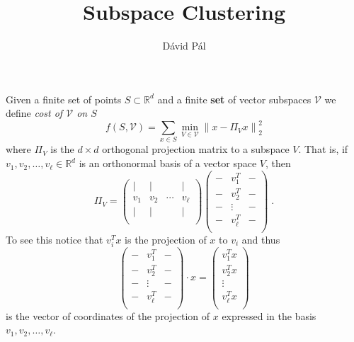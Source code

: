 \documentclass{article}
\newcommand{\R}{\mathbb{R}}
\newcommand{\V}{\mathcal{V}}
\newcommand{\norm}[1]{\left\|#1\right\|}
\begin{document}
\title{Subspace Clustering}
\author{D\'avid P\'al}
\maketitle

Given a finite set of points $S \subset \R^d$ and a finite \textbf{set} of
vector subspaces $\V$ we define \emph{cost of $\V$ on $S$}
$$
f(S, \V) = \sum_{x \in S} \min_{V \in \V} \norm{x - \Pi_V x}_2^2
$$
where $\Pi_V$ is the $d\times d$ orthogonal projection matrix to a subspace $V$.
That is, if $v_1, v_2, \dots, v_\ell \in \R^d$ is an orthonormal basis
of a vector space $V$, then
$$
\Pi_V =
\begin{pmatrix}
\vert & \vert &  & \vert \\
v_1 & v_2 & \cdots & v_\ell \\
\vert & \vert &  & \vert \\
\end{pmatrix}
\begin{pmatrix}
- & v_1^T & - \\
- & v_2^T & - \\
- & \vdots & - \\
- & v_\ell^T & - \\
\end{pmatrix} \; .
$$
To see this notice that $v_i^T x$ is the projection of $x$ to $v_i$
and thus
$$
\begin{pmatrix}
- & v_1^T & - \\
- & v_2^T & - \\
- & \vdots & - \\
- & v_\ell^T & - \\
\end{pmatrix} \cdot x
=
\begin{pmatrix}
v_1^T x \\
v_2^T x \\
\vdots  \\
v_\ell^T x \\
\end{pmatrix}
$$
is the vector of coordinates of the projection of $x$ expressed in the basis $v_1, v_2, \dots, v_{\ell}$.
\end{document}
